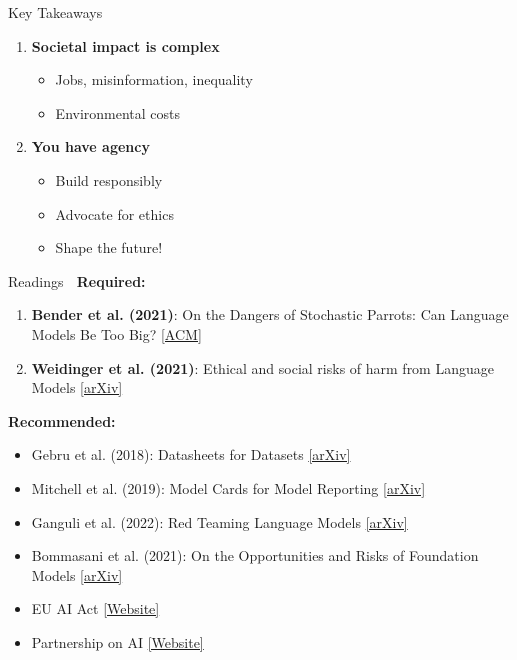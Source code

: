 \documentclass[aspectratio=169]{beamer}
\begin{document}
\begin{frame}[shrink=10]{Key Takeaways 🔑}
\begin{enumerate}
    \vspace{0.2em}

    \item \textbf{Societal impact is complex}
    \begin{itemize}\setlength{\itemsep}{0pt}
        \item Jobs, misinformation, inequality
        \item Environmental costs
    \end{itemize}

    \vspace{0.2em}

    \item \textbf{You have agency}
    \begin{itemize}\setlength{\itemsep}{0pt}
        \item Build responsibly
        \item Advocate for ethics
        \item Shape the future!
    \end{itemize}
\end{enumerate}
\end{frame}

\begin{frame}[shrink=10]{Readings 📖}
\textbf{Required:}
\begin{enumerate}\setlength{\itemsep}{0pt}
    \item \textbf{Bender et al. (2021)}: On the Dangers of Stochastic Parrots: Can Language Models Be Too Big?
    \href{https://dl.acm.org/doi/10.1145/3442188.3445922}{[ACM]}

    \item \textbf{Weidinger et al. (2021)}: Ethical and social risks of harm from Language Models
    \href{https://arxiv.org/abs/2112.04359}{[arXiv]}
\end{enumerate}

\vspace{0.5em}

\textbf{Recommended:}
\begin{itemize}\setlength{\itemsep}{0pt}
    \item Gebru et al. (2018): Datasheets for Datasets \href{https://arxiv.org/abs/1803.09010}{[arXiv]}
    \item Mitchell et al. (2019): Model Cards for Model Reporting \href{https://arxiv.org/abs/1810.03993}{[arXiv]}
    \item Ganguli et al. (2022): Red Teaming Language Models \href{https://arxiv.org/abs/2209.07858}{[arXiv]}
    \item Bommasani et al. (2021): On the Opportunities and Risks of Foundation Models \href{https://arxiv.org/abs/2108.07258}{[arXiv]}
    \item EU AI Act \href{https://artificialintelligenceact.eu/}{[Website]}
    \item Partnership on AI \href{https://partnershiponai.org/}{[Website]}
\end{itemize}
\end{frame}
\end{document}
